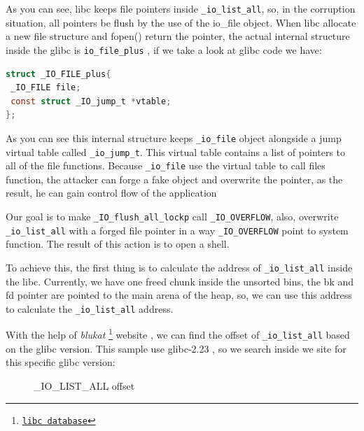 \documentclass{masterthesis}
\newcommand*\libc{glibc}
\newcommand*\ub{unsorted bins}
\begin{document}
As you can see, libc keeps file pointers inside \lstinline{_io_list_all}, so, in the corruption situation, all pointers be flush by the use of the io\_file object. When libc allocate a new file structure and fopen() return the pointer, the actual internal structure inside the \libc{} is \lstinline{io_file_plus} , if we take a look at \libc{} code we have:

\begin{lstlisting}[language=c,frame=tlrb]
struct _IO_FILE_plus{
 _IO_FILE file;
 const struct _IO_jump_t *vtable;
};
\end{lstlisting}

As you can see this internal structure keeps \lstinline{_io_file} object alongside a jump virtual table called \lstinline{_io_jump_t}. This virtual table contains a list of pointers to all of the file functions. Because \lstinline{_io_file} use the virtual table to call files function, the attacker can forge a fake object and overwrite the pointer, as the result, he can gain control flow of the application

Our goal is to make \lstinline{_IO_flush_all_lockp} call \lstinline{_IO_OVERFLOW}, also, overwrite \lstinline{_io_list_all} with a forged file pointer in a way \lstinline{_IO_OVERFLOW} point to system function. The result of this action is to open a shell.

To achieve this, the first thing is to calculate the address of \lstinline{_io_list_all} inside the libc. Currently, we have one freed chunk inside the \ub{}, the bk and fd pointer are pointed to the main arena of the heap, so, we can use this address to calculate the \lstinline{_io_list_all} address. 

With the help of \emph{blukat}  \footnote{\href{https://libc.blukat.me}{\texttt{libc database}}} website , we can find the offset of \lstinline{_io_list_all} based on the \libc{} version. This sample use \libc{-2.23} , so we search inside we site for this specific \libc{} version:

\begin{figure}[h!]
  \caption{\_IO\_LIST\_ALL offset}
\end{figure}
\end{document}
